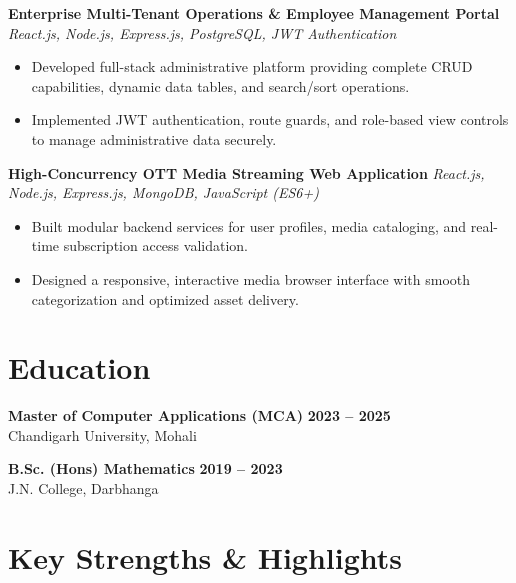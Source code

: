\documentclass[a4paper,10pt]{article}
\begin{document}
\textbf{Enterprise Multi-Tenant Operations \& Employee Management Portal}
\hfill
\textit{React.js, Node.js, Express.js, PostgreSQL, JWT Authentication}

\begin{itemize}

    \item Developed full-stack administrative platform providing complete CRUD capabilities, dynamic data tables, and search/sort operations.

    \item Implemented JWT authentication, route guards, and role-based view controls to manage administrative data securely.

\end{itemize}


\textbf{High-Concurrency OTT Media Streaming Web Application}
\hfill
\textit{React.js, Node.js, Express.js, MongoDB, JavaScript (ES6+)}

\begin{itemize}

    \item Built modular backend services for user profiles, media cataloging, and real-time subscription access validation.

    \item Designed a responsive, interactive media browser interface with smooth categorization and optimized asset delivery.

\end{itemize}

\section*{Education}

\textbf{Master of Computer Applications (MCA)}
\hfill
\textbf{2023 -- 2025}
\\
Chandigarh University, Mohali

\vspace{3pt}

\textbf{B.Sc. (Hons) Mathematics}
\hfill
\textbf{2019 -- 2023}
\\
J.N. College, Darbhanga

\section*{Key Strengths \& Highlights}
\end{document}
